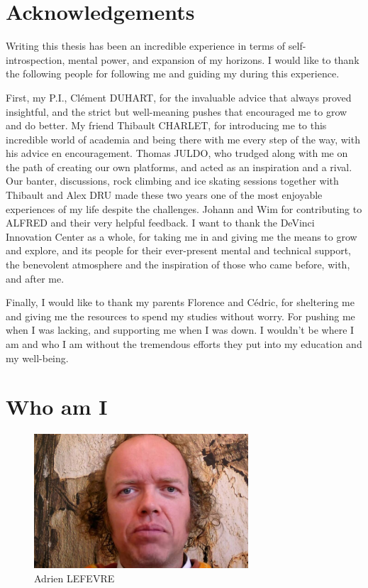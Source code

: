 \section{Acknowledgements}

Writing this thesis has been an incredible experience in terms of self-introspection, mental power, and expansion of my horizons. I would like to thank the following people for following me and guiding my during this experience.

First, my P.I., Clément DUHART, for the invaluable advice that always proved insightful, and the strict but well-meaning pushes that encouraged me to grow and do better. My friend Thibault CHARLET, for introducing me to this incredible world of academia and being there with me every step of the way, with his advice en encouragement. Thomas JULDO, who trudged along with me on the path of creating our own platforms, and acted as an inspiration and a rival. Our banter, discussions, rock climbing and ice skating sessions together with Thibault and Alex DRU made these two years one of the most enjoyable experiences of my life despite the challenges. Johann and Wim for contributing to ALFRED and their very helpful feedback. I want to thank the DeVinci Innovation Center as a whole, for taking me in and giving me the means to grow and explore, and its people for their ever-present mental and technical support, the benevolent atmosphere and the inspiration of those who came before, with, and after me.

Finally, I would like to thank my parents Florence and Cédric, for sheltering me and giving me the resources to spend my studies without worry. For pushing me when I was lacking, and supporting me when I was down. I wouldn't be where I am and who I am without the tremendous efforts they put into my education and my well-being.




\newpage


\section{Who am I}

\begin{figure}[h]
    \centering
    \includegraphics[width=8cm]{images/adrien.jpeg}
    \caption{Adrien LEFEVRE}
\end{figure}


